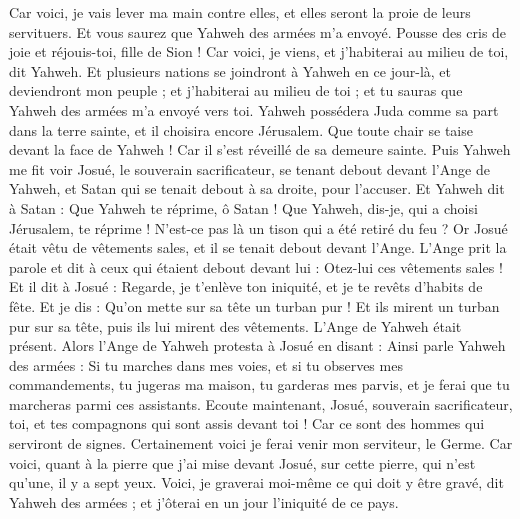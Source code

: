 \begin{multicols}{2}
Car voici, je vais lever ma main contre elles, et elles seront la proie de leurs servituers. Et vous saurez que Yahweh des armées m'a envoyé.
Pousse des cris de joie et réjouis-toi, fille de Sion ! Car voici, je viens, et j'habiterai au milieu de toi, dit Yahweh.
Et plusieurs nations se joindront à Yahweh en ce jour-là, et deviendront mon peuple ; et j'habiterai au milieu de toi ; et tu sauras que Yahweh des armées m'a envoyé vers toi.
Yahweh possédera Juda comme sa part dans la terre sainte, et il choisira encore Jérusalem.
Que toute chair se taise devant la face de Yahweh ! Car il s'est réveillé de sa demeure sainte.
\VerseOne{}Puis Yahweh me fit voir Josué, le souverain sacrificateur, se tenant debout devant l'Ange de Yahweh, et Satan qui se tenait debout à sa droite, pour l'accuser.
Et Yahweh dit à Satan : Que Yahweh te réprime, ô Satan ! Que Yahweh, dis-je, qui a choisi Jérusalem, te réprime ! N'est-ce pas là un tison qui a été retiré du feu ?
Or Josué était vêtu de vêtements sales, et il se tenait debout devant l'Ange.
L'Ange prit la parole et dit à ceux qui étaient debout devant lui : Otez-lui ces vêtements sales ! Et il dit à Josué : Regarde, je t'enlève ton iniquité, et je te revêts d'habits de fête.
Et je dis : Qu'on mette sur sa tête un turban pur ! Et ils mirent un turban pur sur sa tête, puis ils lui mirent des vêtements. L'Ange de Yahweh était présent.
Alors l'Ange de Yahweh protesta à Josué en disant :
Ainsi parle Yahweh des armées : Si tu marches dans mes voies, et si tu observes mes commandements, tu jugeras ma maison, tu garderas mes parvis, et je ferai que tu marcheras parmi ces assistants.
Ecoute maintenant, Josué, souverain sacrificateur, toi, et tes compagnons qui sont assis devant toi ! Car ce sont des hommes qui serviront de signes. Certainement voici je ferai venir mon serviteur, le Germe.
Car voici, quant à la pierre que j'ai mise devant Josué, sur cette pierre, qui n'est qu'une, il y a sept yeux. Voici, je graverai moi-même ce qui doit y être gravé, dit Yahweh des armées ; et j'ôterai en un jour l'iniquité de ce pays.

\end{multicols}
